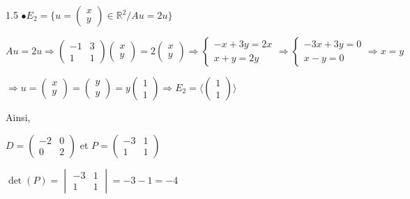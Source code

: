 \documentclass[12pt]{article}
\begin{document}
\begin{spacing}{1.5}
$\bullet E_{2}=\{u=\begin{pmatrix}
x\\
y
\end{pmatrix}\in \mathbb{R}^2/Au=2u\}$

$Au=2u\Rightarrow \begin{pmatrix}
-1 & 3 \\
1 & 1
\end{pmatrix}\begin{pmatrix}
x\\
y
\end{pmatrix}=2\begin{pmatrix}
x\\
y
\end{pmatrix}\Rightarrow \begin{cases}
-x+3y=2x\\
x+y=2y
\end{cases}\Rightarrow\begin{cases}
-3x+3y=0\\
x-y=0
\end{cases}\Rightarrow x=y$

$\Rightarrow u=\begin{pmatrix}
x\\
y
\end{pmatrix}=\begin{pmatrix}
y\\
y
\end{pmatrix}=y\begin{pmatrix}
1\\
1
\end{pmatrix}\Rightarrow E_{2}=\langle \begin{pmatrix}
1\\
1
\end{pmatrix}\rangle$

Ainsi, 

$D=\begin{pmatrix}
-2 & 0\\
0 & 2
\end{pmatrix}$ et $P=\begin{pmatrix}
-3 & 1\\
1 & 1
\end{pmatrix}$

$\det(P)=\begin{vmatrix}
-3 & 1\\
1 & 1
\end{vmatrix}=-3-1=-4$



\end{spacing}
\end{document}
